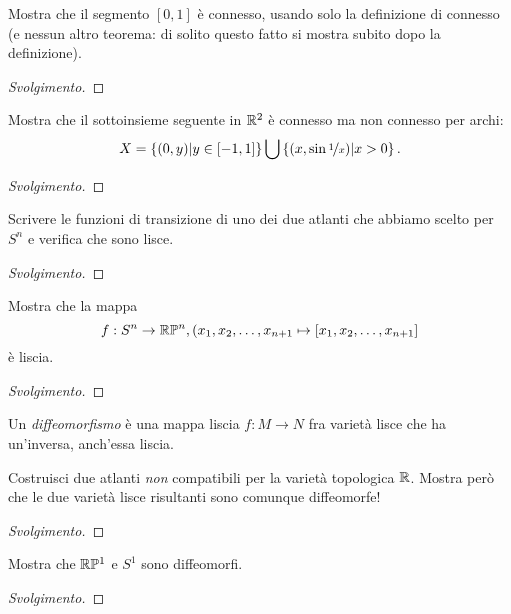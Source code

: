 \documentclass{article}[a4paper, 12pt, italian]
\begin{document}
\begin{exercise}
Mostra che il segmento $[0, 1]$ è connesso, usando solo la definizione di
connesso (e nessun altro teorema: di solito questo fatto si mostra subito dopo
la definizione).
\begin{proof}[Svolgimento]

\end{proof}
\end{exercise}

\begin{exercise}
Mostra che il sottoinsieme seguente in $\mathbb{R}^2$ è connesso ma non connesso per
archi:
\[
X = \left\{(0, y) | y \in [-1, 1]\right\} \bigcup
\left\{(x, \sin{\nicefrac{1}{x}}) | x > 0\right\}
.\]
\begin{proof}[Svolgimento]

\end{proof}
\end{exercise}

\begin{exercise}
Scrivere le funzioni di transizione di uno dei due atlanti che abbiamo scelto
per $S^n$ e verifica che sono lisce.
\begin{proof}[Svolgimento]

\end{proof}
\end{exercise}

\begin{exercise}
Mostra che la mappa
\[
f: S^n \to \mathbb{R}\mathbb{P}^n, (x_1, x_2, \ldots, x_{n+1} \mapsto
[x_1, x_2, \ldots, x_{n+1}]
\]
è liscia.
\begin{proof}[Svolgimento]

\end{proof}
\end{exercise}

Un \emph{diffeomorfismo} è una mappa liscia $f: M \to N$ fra varietà lisce
che ha un'inversa, anch'essa liscia.

\begin{exercise}
Costruisci due atlanti \emph{non} compatibili per la varietà topologica $\mathbb{R}$.
Mostra però che le due varietà lisce risultanti sono comunque diffeomorfe!
\begin{proof}[Svolgimento]

\end{proof}
\end{exercise}

\begin{exercise}
Mostra che $\mathbb{R}\mathbb{P}^1$ e $S^1$ sono diffeomorfi.
\begin{proof}[Svolgimento]

\end{proof}
\end{exercise}
\end{document}
